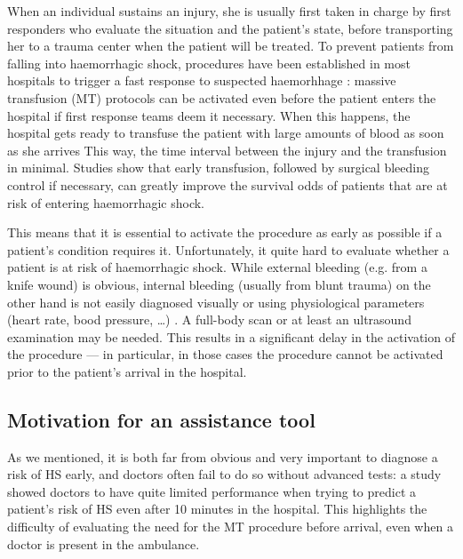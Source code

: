 \documentclass[12pt, a4paper]{memoir}
\begin{document}
When an individual sustains an injury, she is usually first taken in charge by first responders who evaluate the situation and the patient's state, before transporting her to a trauma center when the patient will be treated.
To prevent patients from falling into haemorrhagic shock, procedures have been established in most hospitals to trigger a fast response to suspected haemorhhage \cite{gestalt}: massive transfusion (MT) protocols can be activated even before the patient enters the hospital if first response teams deem it necessary. When this happens, the hospital gets ready to transfuse the patient with large amounts of blood as soon as she arrives This way, the time interval between the injury and the transfusion in minimal. Studies \cite{death_in_the_operating_room} \cite{modern_combat_support} show that early transfusion, followed by surgical bleeding control if necessary, can greatly improve the survival odds of patients that are at risk of entering haemorrhagic shock.

This means that it is essential to activate the procedure as early as possible if a patient's condition requires it. Unfortunately, it quite hard to evaluate whether a patient is at risk of haemorrhagic shock. While external bleeding (e.g. from a knife wound) is obvious, internal bleeding (usually from blunt trauma) on the other hand is not easily diagnosed visually or using physiological parameters (heart rate, bood pressure, \ldots) \cite{estimation_of_blood_loss}. A full-body scan or at least an ultrasound examination \cite{FAST?} may be needed. This results in a significant delay in the activation of the procedure --- in particular, in those cases the procedure cannot be activated prior to the patient's arrival in the hospital.

		\subsection{Motivation for an assistance tool}

As we mentioned, it is both far from obvious and very important to diagnose a risk of HS early, and doctors often fail to do so without advanced tests: a study \cite{AUC_doctors} showed doctors to have quite limited performance when trying to predict a patient's risk of HS even after 10 minutes in the hospital. This highlights the difficulty of evaluating the need for the MT procedure before arrival, even when a doctor is present in the ambulance.
\end{document}
